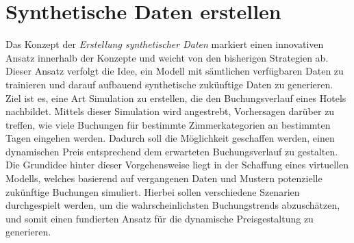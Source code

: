 \section{Synthetische Daten erstellen}
\label{sec:Synthetische}
Das Konzept der \emph{Erstellung synthetischer Daten} markiert einen innovativen Ansatz innerhalb der Konzepte und weicht von den bisherigen Strategien ab. Dieser Ansatz verfolgt die Idee, ein Modell mit sämtlichen verfügbaren Daten zu trainieren und darauf aufbauend synthetische zukünftige Daten zu generieren. Ziel ist es, eine Art Simulation zu erstellen, die den Buchungsverlauf eines Hotels nachbildet.
\newline
\newline
Mittels dieser Simulation wird angestrebt, Vorhersagen darüber zu treffen, wie viele Buchungen für bestimmte Zimmerkategorien an bestimmten Tagen eingehen werden. Dadurch soll die Möglichkeit geschaffen werden, einen dynamischen Preis entsprechend dem erwarteten Buchungsverlauf zu gestalten.
\newline
\newline
Die Grundidee hinter dieser Vorgehensweise liegt in der Schaffung eines virtuellen Modells, welches basierend auf vergangenen Daten und Mustern potenzielle zukünftige Buchungen simuliert. Hierbei sollen verschiedene Szenarien durchgespielt werden, um die wahrscheinlichsten Buchungstrends abzuschätzen, und somit einen fundierten Ansatz für die dynamische Preisgestaltung zu generieren.